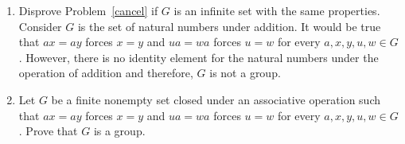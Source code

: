 \documentclass[11pt]{article}
\begin{document}
\begin{enumerate}
\begin{proof}
In order to prove that $U_n$ is congruent under multiplication modulo $n$ we need to show that it is nonempty, contains an identity, contains inverses, is closed under the operation, and is associative. However, given that problem 7 is true, we only need to prove that the set $U_n$ is closed under the operation and that the operation is associative. Luckily, multiplication modulo $n$ is associative, so then we know that the operation of $U_n$ is associative. Consider $a,b\in U_n$, that means that $\gcd(a, n)=1$ and $\gcd (b,n)=1$ which implies that $\gcd(ab,n)=1$ which therefore means that $ab\in U_n$ and the operation is closed. Therefore, $U_n$ is a group. 
\end{proof}

\pagebreak
\item Disprove Problem~\ref{cancel} if $G$ is an infinite set with the
same properties. \\

Consider $G$ is the set of natural numbers under addition. It would be true that $ax = ay$ forces $x = y$ and $ua = wa$ forces $u = w$ for every $a, x, y, u, w \in G$. However, there is no identity element for the natural numbers under the operation of addition and therefore, $G$ is not a group.

\pagebreak
\item 
Let $G$ be a finite nonempty set closed under an associative 
operation such that $ax = ay$ forces $x = y$ and $ua = wa$ forces 
$u = w$ for every $a, x, y, u, w \in G$.  
Prove that $G$ is a group.  \label{cancel}\\




\end{enumerate}
\end{document}
